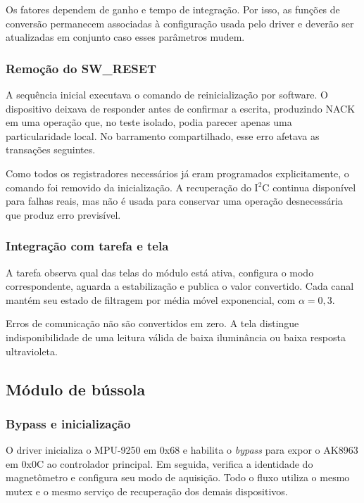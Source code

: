 \documentclass[a4paper,12pt]{article}
\begin{document}
Os fatores dependem de ganho e tempo de integra\c{c}\~ao. Por isso, as fun\c{c}\~oes de convers\~ao permanecem associadas \`a configura\c{c}\~ao usada pelo driver e dever\~ao ser atualizadas em conjunto caso esses par\^ametros mudem.


\subsubsection{Remo\c{c}\~ao do SW\_RESET}


A sequ\^encia inicial executava o comando de reinicializa\c{c}\~ao por software. O dispositivo deixava de responder antes de confirmar a escrita, produzindo NACK em uma opera\c{c}\~ao que, no teste isolado, podia parecer apenas uma particularidade local. No barramento compartilhado, esse erro afetava as transa\c{c}\~oes seguintes.


Como todos os registradores necess\'arios j\'a eram programados explicitamente, o comando foi removido da inicializa\c{c}\~ao. A recupera\c{c}\~ao do I$^2$C continua dispon\'ivel para falhas reais, mas n\~ao \'e usada para conservar uma opera\c{c}\~ao desnecess\'aria que produz erro previs\'ivel.


\subsubsection{Integra\c{c}\~ao com tarefa e tela}


A tarefa observa qual das telas do m\'odulo est\'a ativa, configura o modo correspondente, aguarda a estabiliza\c{c}\~ao e publica o valor convertido. Cada canal mant\'em seu estado de filtragem por m\'edia m\'ovel exponencial, com $\alpha=0{,}3$.


Erros de comunica\c{c}\~ao n\~ao s\~ao convertidos em zero. A tela distingue indisponibilidade de uma leitura v\'alida de baixa ilumin\^ancia ou baixa resposta ultravioleta.


\subsection{M\'odulo de b\'ussola}


\subsubsection{Bypass e inicializa\c{c}\~ao}


O driver inicializa o MPU-9250 em 0x68 e habilita o \emph{bypass} para expor o AK8963 em 0x0C ao controlador principal. Em seguida, verifica a identidade do magnet\^ometro e configura seu modo de aquisi\c{c}\~ao. Todo o fluxo utiliza o mesmo mutex e o mesmo servi\c{c}o de recupera\c{c}\~ao dos demais dispositivos.
\end{document}
